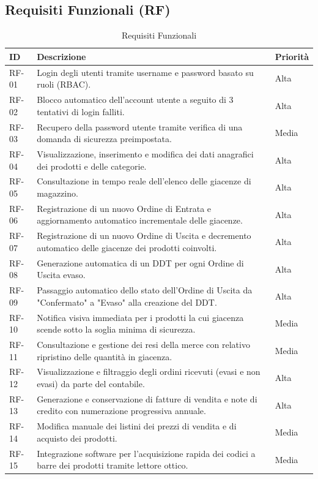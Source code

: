 \documentclass[a4paper,12pt]{article}
\begin{document}
\subsection{Requisiti Funzionali (RF)}
\begin{longtable}{p{} p{} p{}}
\caption{Requisiti Funzionali} \\
\toprule
\textbf{ID} & \textbf{Descrizione} & \textbf{Priorità} \\
\midrule
RF-01 & Login degli utenti tramite username e password basato su ruoli (RBAC). & Alta \\
RF-02 & Blocco automatico dell'account utente a seguito di 3 tentativi di login falliti. & Alta \\
RF-03 & Recupero della password utente tramite verifica di una domanda di sicurezza preimpostata. & Media \\
RF-04 & Visualizzazione, inserimento e modifica dei dati anagrafici dei prodotti e delle categorie. & Alta \\
RF-05 & Consultazione in tempo reale dell'elenco delle giacenze di magazzino. & Alta \\
RF-06 & Registrazione di un nuovo Ordine di Entrata e aggiornamento automatico incrementale delle giacenze. & Alta \\
RF-07 & Registrazione di un nuovo Ordine di Uscita e decremento automatico delle giacenze dei prodotti coinvolti. & Alta \\
RF-08 & Generazione automatica di un DDT per ogni Ordine di Uscita evaso. & Alta \\
RF-09 & Passaggio automatico dello stato dell'Ordine di Uscita da "Confermato" a "Evaso" alla creazione del DDT. & Alta \\
RF-10 & Notifica visiva immediata per i prodotti la cui giacenza scende sotto la soglia minima di sicurezza. & Media \\
RF-11 & Consultazione e gestione dei resi della merce con relativo ripristino delle quantità in giacenza. & Media \\
RF-12 & Visualizzazione e filtraggio degli ordini ricevuti (evasi e non evasi) da parte del contabile. & Alta \\
RF-13 & Generazione e conservazione di fatture di vendita e note di credito con numerazione progressiva annuale. & Alta \\
RF-14 & Modifica manuale dei listini dei prezzi di vendita e di acquisto dei prodotti. & Media \\
RF-15 & Integrazione software per l'acquisizione rapida dei codici a barre dei prodotti tramite lettore ottico. & Media \\
\bottomrule
\end{longtable}
\end{document}
